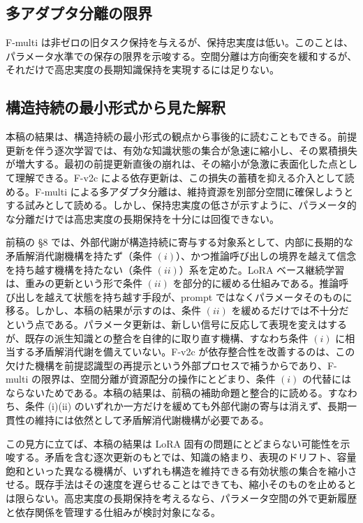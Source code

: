 \documentclass[12pt,a4paper]{article}
\begin{document}
\subsection{多アダプタ分離の限界}\label{ux591aux30a2ux30c0ux30d7ux30bfux5206ux96e2ux306eux9650ux754c}

F-multi は非ゼロの旧タスク保持を与えるが、保持忠実度は低い。このことは、パラメータ水準での保存の限界を示唆する。空間分離は方向衝突を緩和するが、それだけで高忠実度の長期知識保持を実現するには足りない。

\subsection{構造持続の最小形式から見た解釈}\label{ux69cbux9020ux6301ux7d9aux306eux6700ux5c0fux5f62ux5f0fux304bux3089ux898bux305fux89e3ux91c8}

本稿の結果は、構造持続の最小形式の観点から事後的に読むこともできる。前提更新を伴う逐次学習では、有効な知識状態の集合が急速に縮小し、その累積損失が増大する。最初の前提更新直後の崩れは、その縮小が急激に表面化した点として理解できる。F-v2c による依存更新は、この損失の蓄積を抑える介入として読める。F-multi による多アダプタ分離は、維持資源を別部分空間に確保しようとする試みとして読める。しかし、保持忠実度の低さが示すように、パラメータ的な分離だけでは高忠実度の長期保持を十分には回復できない。

前稿の §8 では、外部代謝が構造持続に寄与する対象系として、内部に長期的な矛盾解消代謝機構を持たず（条件 \((i)\)）、かつ推論呼び出しの境界を越えて信念を持ち越す機構を持たない（条件 \((ii)\)）系を定めた。LoRA ベース継続学習は、重みの更新という形で条件 \((ii)\) を部分的に緩める仕組みである。推論呼び出しを越えて状態を持ち越す手段が、prompt ではなくパラメータそのものに移る。しかし、本稿の結果が示すのは、条件 \((ii)\) を緩めるだけでは不十分だという点である。パラメータ更新は、新しい信号に反応して表現を変えはするが、既存の派生知識との整合を自律的に取り直す機構、すなわち条件 \((i)\) に相当する矛盾解消代謝を備えていない。F-v2c が依存整合性を改善するのは、この欠けた機構を前提認識型の再提示という外部プロセスで補うからであり、F-multi の限界は、空間分離が資源配分の操作にとどまり、条件 \((i)\) の代替にはならないためである。本稿の結果は、前稿の補助命題と整合的に読める。すなわち、条件 (i)(ii) のいずれか一方だけを緩めても外部代謝の寄与は消えず、長期一貫性の維持には依然として矛盾解消代謝機構が必要である。

この見方に立てば、本稿の結果は LoRA 固有の問題にとどまらない可能性を示唆する。矛盾を含む逐次更新のもとでは、知識の絡まり、表現のドリフト、容量飽和といった異なる機構が、いずれも構造を維持できる有効状態の集合を縮小させる。既存手法はその速度を遅らせることはできても、縮小そのものを止めるとは限らない。高忠実度の長期保持を考えるなら、パラメータ空間の外で更新履歴と依存関係を管理する仕組みが検討対象になる。
\end{document}
